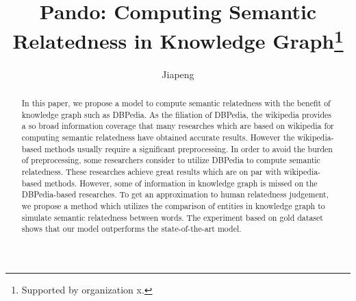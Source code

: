 \documentclass[runningheads]{llncs}
\begin{document}
  \title{Pando: Computing Semantic Relatedness in Knowledge Graph\thanks{Supported by organization x.}}
  \author{Jiapeng }
  
  \maketitle              %
  \begin{abstract}
    In this paper, we propose a model to compute semantic relatedness with the benefit of knowledge graph
    such as DBPedia.
    As the filiation of DBPedia, the wikipedia provides a so broad information coverage that many researches which
    are based on wikipedia for computing semantic relatedness have obtained accurate results. However the wikipedia-based
    methods usually require a significant preprocessing. In order to avoid the burden of preprocessing, some researchers
    consider to utilize DBPedia to compute semantic relatedness. These researches
    achieve great results which are on par with wikipedia-based methods. However, some of information in knowledge graph
    is missed on the DBPedia-based researches. To get an approximation to human relatedness judgement, we propose a method which
    utilizes the comparison of entities in knowledge graph to simulate semantic relatedness between words.
    The experiment based on gold dataset shows that our model outperforms the state-of-the-art model.
  
  \end{abstract}
  
  
  
  
  

  
  
  
\end{document}
